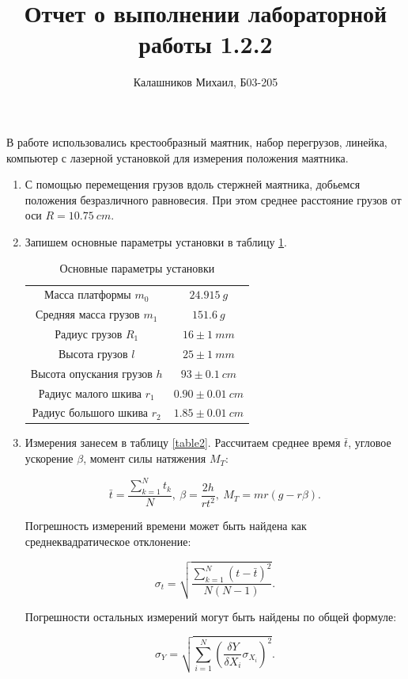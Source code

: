 \documentclass[14pt, a4paper]{article}
\title{\textbf{Отчет о выполнении лабораторной работы 1.2.2}}
\author{Калашников Михаил, Б03-205}
\date{}
\begin{document}
\maketitle

В работе использовались крестообразный маятник, набор перегрузов, линейка, компьютер с лазерной установкой для измерения положения маятника.

\begin{enumerate}

\item С помощью перемещения грузов вдоль стержней маятника, добьемся положения безразличного равновесия. При этом среднее расстояние грузов от оси $R=10.75\ cm$.

\item Запишем основные параметры установки в таблицу \ref{table1}.

\begin{table}[!h]
\centering
\begin{tabular}{| c | c |}
\hline
Масса платформы $m_0$ & $24.915\ g$ \\
Средняя масса грузов $m_1$ & $151.6\ g$ \\
Радиус грузов $R_1$ & $16\pm1\ mm$ \\
Высота грузов $l$ & $25\pm1\ mm$ \\
Высота опускания грузов $h$ & $93\pm0.1\ cm$ \\
Радиус малого шкива $r_1$ & $0.90\pm0.01\ cm$ \\
Радиус большого шкива $r_2$ & $1.85\pm0.01\ cm$ \\
\hline
\end{tabular}
\caption{Основные параметры установки}
\label{table1}
\end{table}


\item Измерения занесем в таблицу \ref{table2}. Рассчитаем среднее время $\bar{t}$, угловое ускорение $\beta$, момент силы натяжения $M_T$:

\[\bar{t}=\frac{\sum_{k=1}^{N}t_k}{N},\ \beta=\frac{2h}{rt^2},\ M_T=mr(g-r\beta).\]

Погрешность измерений времени может быть найдена как среднеквадратическое отклонение:

\[\sigma_t=\sqrt{\frac{\sum_{k=1}^N(t-\bar{t})^2}{N(N-1)}}.\]

Погрешности остальных измерений могут быть найдены по общей формуле:

\[\sigma_Y=\sqrt{\sum_{i=1}^N\left(\frac{\delta Y}{\delta X_i}\sigma_{X_i}\right)^2}.\]


\end{enumerate}
\end{document}
